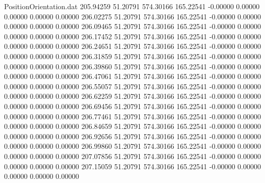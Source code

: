 \begin{filecontents}{PositionOrientation.dat}
 205.94259   51.20791  574.30166   165.22541   -0.00000    0.00000    0.00000    0.00000    0.00000
 206.02275   51.20791  574.30166   165.22541   -0.00000    0.00000    0.00000    0.00000    0.00000
 206.09465   51.20791  574.30166   165.22541   -0.00000    0.00000    0.00000    0.00000    0.00000
 206.17452   51.20791  574.30166   165.22541   -0.00000    0.00000    0.00000    0.00000    0.00000
 206.24651   51.20791  574.30166   165.22541   -0.00000    0.00000    0.00000    0.00000    0.00000
 206.31859   51.20791  574.30166   165.22541   -0.00000    0.00000    0.00000    0.00000    0.00000
 206.39860   51.20791  574.30166   165.22541   -0.00000    0.00000    0.00000    0.00000    0.00000
 206.47061   51.20791  574.30166   165.22541   -0.00000    0.00000    0.00000    0.00000    0.00000
 206.55057   51.20791  574.30166   165.22541   -0.00000    0.00000    0.00000    0.00000    0.00000
 206.62259   51.20791  574.30166   165.22541   -0.00000    0.00000    0.00000    0.00000    0.00000
 206.69456   51.20791  574.30166   165.22541   -0.00000    0.00000    0.00000    0.00000    0.00000
 206.77461   51.20791  574.30166   165.22541   -0.00000    0.00000    0.00000    0.00000    0.00000
 206.84659   51.20791  574.30166   165.22541   -0.00000    0.00000    0.00000    0.00000    0.00000
 206.92656   51.20791  574.30166   165.22541   -0.00000    0.00000    0.00000    0.00000    0.00000
 206.99860   51.20791  574.30166   165.22541   -0.00000    0.00000    0.00000    0.00000    0.00000
 207.07856   51.20791  574.30166   165.22541   -0.00000    0.00000    0.00000    0.00000    0.00000
 207.15059   51.20791  574.30166   165.22541   -0.00000    0.00000    0.00000    0.00000    0.00000
\end{filecontents}
